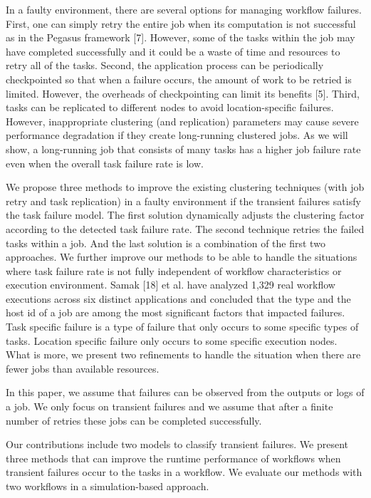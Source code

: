 \documentclass{IOS-Book-Article}
\begin{document}
In a faulty environment, there are several options for managing workflow failures. First, one can simply retry the entire job when its computation is not successful as in the Pegasus framework [7]. However, some of the tasks within the job may have completed successfully and it could be a waste of time and resources to retry all of the tasks. Second, the application process can be periodically checkpointed so that when a failure occurs, the amount of work to be retried is limited. However, the overheads of checkpointing can limit its benefits [5]. Third, tasks can be replicated to different nodes to avoid location-specific failures. However, inappropriate clustering (and replication) parameters may cause severe performance degradation if they create long-running clustered jobs. As we will show, a long-running job that consists of many tasks has a higher job failure rate even when the overall task failure rate is low.   

We propose three methods to improve the existing clustering techniques (with job retry and task replication) in a faulty environment if the transient failures satisfy the task failure model. The first solution dynamically adjusts the clustering factor according to the detected task failure rate. The second technique retries the failed tasks within a job. And the last solution is a combination of the first two approaches. We further improve our methods to be able to handle the situations where task failure rate is not fully independent of workflow characteristics or execution environment. Samak [18] et al. have analyzed 1,329 real workflow executions across six distinct applications and concluded that the type and the host id of a job are among the most significant factors that impacted failures. Task specific failure is a type of failure that only occurs to some specific types of tasks. Location specific failure only occurs to some specific execution nodes. What is more, we present two refinements to handle the situation when there are fewer jobs than available resources. 

In this paper, we assume that failures can be observed from the outputs or logs of a job. We only focus on transient failures and we assume that after a finite number of retries these jobs can be completed successfully. 

Our contributions include two models to classify transient failures. We present three methods that can improve the runtime performance of workflows when transient failures occur to the tasks in a workflow. We evaluate our methods with two workflows in a simulation-based approach. 
\end{document}
